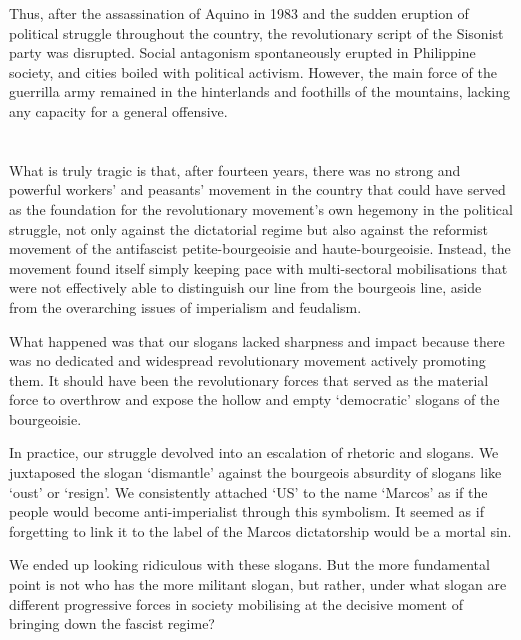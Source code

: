 Thus, after the assassination of Aquino in 1983 
and the sudden eruption of political struggle throughout the country, 
the revolutionary script of the Sisonist party was disrupted. 
Social antagonism spontaneously erupted in Philippine society, 
and cities boiled with political activism. 
However, the main force of the guerrilla army 
remained in the hinterlands and foothills of the mountains, 
lacking any capacity for a general offensive.


\section{}
What is truly tragic is that, 
after fourteen years, 
there was no strong and powerful workers' and peasants' movement in the country 
that could have served as the foundation 
for the revolutionary movement's own hegemony in the political struggle, 
not only against the dictatorial regime 
but also against the reformist movement 
of the antifascist petite-bourgeoisie and haute-bourgeoisie. 
Instead, the movement found itself simply keeping pace 
with multi-sectoral mobilisations 
that were not effectively able to distinguish our line
from the bourgeois line, 
aside from the overarching issues of imperialism and feudalism.

What happened was that our slogans lacked sharpness and impact 
because there was no dedicated and widespread revolutionary movement 
actively promoting them. 
It should have been the revolutionary forces 
that served as the material force 
to overthrow and expose 
the hollow and empty `democratic' slogans of the bourgeoisie.

In practice, our struggle devolved into an escalation of rhetoric and slogans. 
We juxtaposed the slogan `dismantle' 
against the bourgeois absurdity of slogans like `oust' or `resign'. 
We consistently attached `US' to the name `Marcos' 
as if the people would become anti-imperialist through this symbolism. 
It seemed as if forgetting to link it to the label of the Marcos dictatorship 
would be a mortal sin.

We ended up looking ridiculous with these slogans.
But the more fundamental point is not who has the more militant slogan, 
but rather, 
under what slogan are different progressive forces in society mobilising 
at the decisive moment of bringing down the fascist regime?

